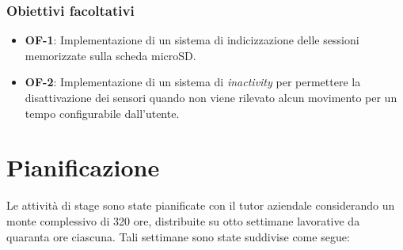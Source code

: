 \subsubsection{Obiettivi facoltativi}

\begin{itemize}
    \item \textbf{OF-1}: Implementazione di un sistema di indicizzazione delle sessioni
    memorizzate sulla scheda microSD.

    \item \textbf{OF-2}: Implementazione di un sistema di \textit{inactivity} per permettere la disattivazione dei sensori
    quando non viene rilevato alcun movimento per un tempo configurabile dall'utente.
\end{itemize}


\section{Pianificazione} \label{sec:pianificazione}

Le attività di stage sono state pianificate con il tutor aziendale considerando un monte complessivo
di 320 ore, distribuite su otto settimane lavorative da quaranta ore ciascuna. Tali settimane sono state 
suddivise come segue:

